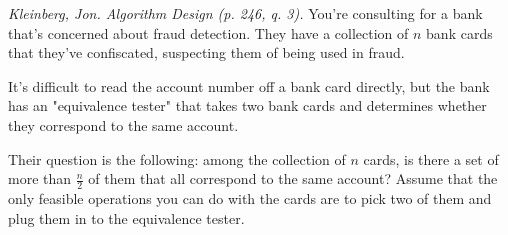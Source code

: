 \documentclass[solutionorbox,answers]{exam}
\begin{document}
\begin{questions}

\pagebreak

 \question \emph{Kleinberg, Jon. Algorithm Design (p. 246, q. 3).} You’re consulting for a bank that’s concerned about fraud detection. They have a collection of $n$ bank cards that they’ve confiscated, suspecting them of being used in fraud. 

It’s difficult to read the account number off a bank card directly, but the bank has an "equivalence tester" that takes two bank cards and determines whether they correspond to the same account. 

Their question is the following: among the collection of $n$ cards, is there a set of more than $\frac{n}{2}$ of them that all correspond to the same account? Assume that the only feasible operations you can do with the cards are to pick two of them and plug them in to the equivalence tester. 

\end{questions}
\end{document}
